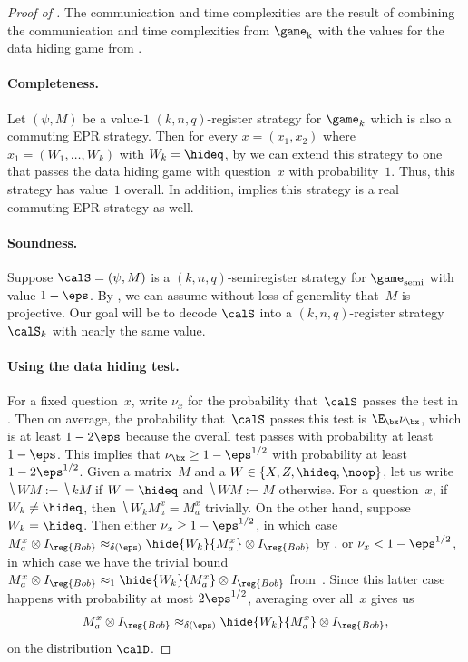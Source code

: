 \newcommand{\phoenicianindahizzous}{\textphnc{h}}

\begin{proof}[Proof of ]
The communication and time complexities are the result of combining
the communication and time complexities from $\game_{\mathrm{k}}$ with the values for the data hiding game from .

\paragraph{Completeness.}
Let $(\psi, M)$ be a value-$1$ $(k,n,q)$-register strategy for $\game_{k}$ which is also a commuting EPR strategy.
Then for every $x = (x_1, x_2)$ where $x_1 = (W_1, \ldots, W_k)$ with $W_k = \hideq$,
by 
we can extend this strategy to one that passes the data hiding game with question~$x$ with probability~$1$.
Thus, this strategy has value~$1$ overall.
In addition,  implies this strategy is a real commuting EPR strategy as well.

\paragraph{Soundness.}
Suppose $\calS = (\psi, M)$ is a $(k, n, q)$-semiregister strategy for $\game_{\mathrm{semi}}$ with value $1-\eps$.
By , we can assume without loss of generality that~$M$ is projective.
Our goal will be to decode $\calS$ into a $(k, n, q)$-register strategy $\calS_{k}$ with nearly the same value.

\paragraph{Using the data hiding test.}
For a fixed question~$x$, write $\nu_x$ for the probability that~$\calS$ passes the test in .
Then on average, the probability that~$\calS$ passes this test is $\E_{\bx} \nu_{\bx}$,
which is at least $1-2\eps$ because the overall test passes with probability at least $1-\eps$.
This implies that $\nu_{\bx} \geq 1-\eps^{1/2}$ with probability at least $1-2\eps^{1/2}$.
Given a matrix~$M$ and a $W \in \{X, Z, \hideq, \noop\}$, let us write $\hide{W}{M}:= \hide{k}{M}$ if $W = \hideq$
and $\hide{W}{M}:=M$ otherwise.
For a question~$x$, if $W_k \neq \hideq$, then $\hide{W_k}{M^x_a} = M^x_a$ trivially.
On the other hand, suppose $W_k = \hideq$.
Then either $\nu_x \geq 1-\eps^{1/2}$,
in which case $M^x_a \otimes I_{\reg{Bob}} \approx_{\delta(\eps)} \hide{W_k}{M^x_a}\otimes I_{\reg{Bob}}$ by ,
or $\nu_x < 1-\eps^{1/2}$,
in which case we have the trivial bound $M^x_a \otimes I_{\reg{Bob}} \approx_{1} \hide{W_k}{M^x_a}\otimes I_{\reg{Bob}}$ from~.
Since this latter case happens with probability at most $2\eps^{1/2}$,
averaging over all~$x$ gives us
\begin{equation}\label{eq:dr-jekyll-mr-hide}
M^x_a \otimes I_{\reg{Bob}} \approx_{\delta(\eps)} \hide{W_k}{M^x_a}\otimes I_{\reg{Bob}},
\end{equation}
on the distribution $\calD$.


\end{proof}
